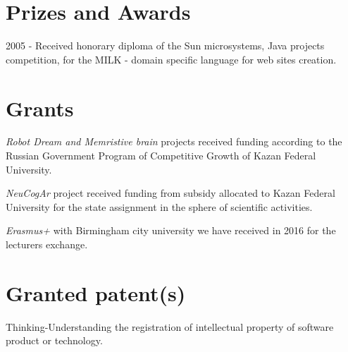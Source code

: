 \documentclass{moderncv}
\begin{document}


\section{Prizes and Awards}

2005 - Received honorary diploma of the Sun microsystems, Java projects competition, for the MILK - domain specific language for web sites creation.

\section{Grants}

\emph{Robot Dream and Memristive brain} projects received funding according to the Russian Government Program of Competitive Growth of Kazan Federal University.

\emph{NeuCogAr} project received funding from subsidy allocated to Kazan Federal University for the state assignment in the sphere of scientific activities.

\emph{Erasmus+} with Birmingham city university we have received in 2016 for the lecturers exchange. 

\section{Granted patent(s)}

Thinking-Understanding the registration of intellectual property of software product or technology.

 
\nocite{*}
\printbibliography[title={Papers}]
\end{document}
